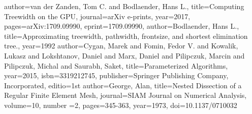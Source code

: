 \begin{bibdiv}
\begin{biblist}
 {
	author={{van der Zanden}, Tom C. and {Bodlaender}, Hans L.},
	title={Computing Treewidth on the GPU},
	journal={arXiv e-prints},
	year={2017},
	pages={arXiv:1709.09990},
	eprint={1709.09990},
}
 {
    author={{Bodlaender}, Hans L.},
    title={Approximating treewidth, pathwidth, frontsize, and shortest elimination tree.},
    year={1992}
}
 {
	author={Cygan, Marek and Fomin, Fedor V. and Kowalik, Lukasz and Lokshtanov, Daniel and Marx, Daniel and Pilipczuk, Marcin and Pilipczuk, Michal and Saurabh, Saket},
	title={Parameterized Algorithms},
	year={2015},
	isbn={3319212745},
	publisher={Springer Publishing Company, Incorporated},
	editio={1st}
}
 {
	author={George, Alan},
	title={Nested Dissection of a Regular Finite Element Mesh},
	journal={SIAM Journal on Numerical Analysis},
	volume={10},
	number ={2},
	pages={345-363},
	year={1973},
	doi={10.1137/0710032}
}
\end{biblist}
\end{bibdiv}
